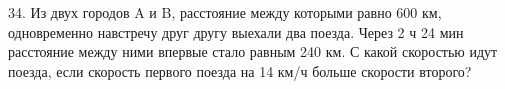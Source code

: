34. Из двух городов A и B, расстояние между которыми равно 600 км, одновременно навстречу друг другу выехали два поезда. Через 2 ч 24 мин расстояние между ними впервые стало равным 240 км. С какой скоростью идут поезда, если скорость первого поезда на 14 км/ч больше скорости второго?\\
